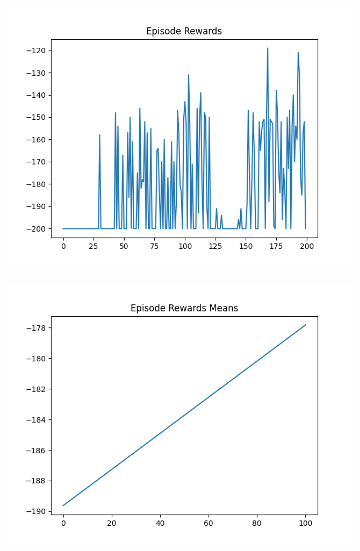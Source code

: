 \begin{figure}[H]
    \centering
    \begin{subfigure}{.47\linewidth}
        \centering
        \includegraphics[width=\textwidth]{mountain/2024-06-15_13-45-47_dqn_mountaincar_episode_rewards.png}
    \end{subfigure}
    \begin{subfigure}{.47\linewidth}
        \centering
        \includegraphics[width=\textwidth]{mountain/2024-06-15_13-45-47_dqn_mountaincar_episode_rewards_means.png}
    \end{subfigure}
    \begin{subfigure}{.47\linewidth}
        \centering

\end{subfigure}
\end{figure}
